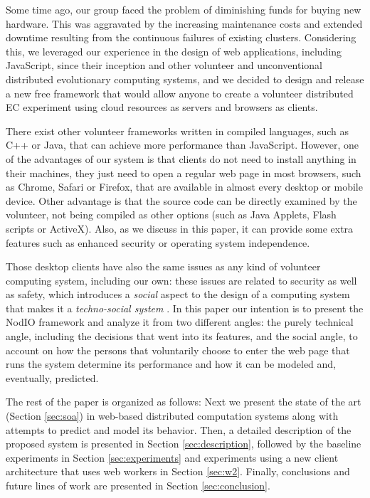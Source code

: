 \documentclass[journal,onecolumn]{IEEEtran}
\begin{document}
Some time ago, our group faced the problem of diminishing funds for
buying new hardware. This was aggravated by the increasing maintenance costs and
extended downtime resulting from the continuous failures of existing
clusters.
Considering this, we leveraged our experience in the design of web
applications, including JavaScript, since their inception and other
volunteer and
unconventional distributed evolutionary computing systems, and we
decided to design and release a new free framework that would allow anyone to
create a volunteer distributed EC experiment using cloud resources as
servers and browsers as clients.

There exist other volunteer frameworks written in compiled languages,
such as C++ or Java, that can achieve more performance than
JavaScript. However, one of the advantages of our system is that
clients do not need to install anything in their machines, they just
need to open a regular web page  
in most browsers, such as Chrome, Safari or Firefox, that are
available in almost every desktop or mobile device. Other advantage is
that the source code can be directly examined by the volunteer, not
being compiled as other options (such as Java Applets, Flash scripts or
ActiveX). Also, as we discuss in this paper, it can provide some extra
features such as enhanced security or operating system independence. 

Those desktop clients have also the same issues as any kind of
volunteer computing system, including our own:  these issues are
related to security as well as
safety, which introduces a {\em social} aspect to the design of a
computing system that makes it a {\em techno-social system}
\cite{vespignani2009predicting}. In this paper our intention is to
present the {\sf NodIO} framework and analyze it from two different
angles: the purely technical angle, including the decisions that went
into its features, and the social angle, to account on how the persons
that voluntarily choose to enter the web page that runs the system
determine its performance and how it can be modeled and, eventually,
predicted.

The rest of the paper is organized as follows: Next we present the
state of the art (Section \ref{sec:soa}) in web-based distributed
computation systems along with attempts to predict and model its behavior. 
Then, a detailed description of the proposed system is presented
in Section \ref{sec:description}, followed by the baseline experiments
in Section \ref{sec:experiments} and experiments using a new client
architecture that uses web workers in Section \ref{sec:w2}.
Finally, conclusions and future lines of work are presented in Section
\ref{sec:conclusion}. 
\end{document}
